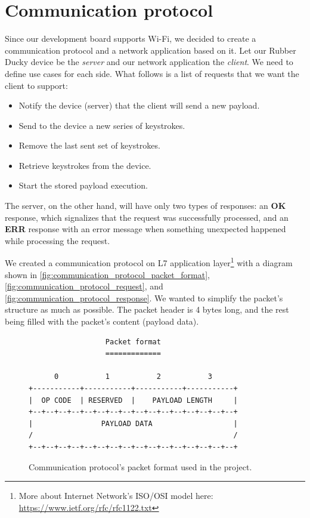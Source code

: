 \section{Communication protocol}
\label{sec:design_communication_protocol}
Since our development board supports Wi-Fi, we decided to create a communication protocol and a network application based on it. Let our Rubber Ducky device be the \emph{server} and our network application the \emph{client}. We need to define use cases for each side. What follows is a list of requests that we want the client to support:
\begin{itemize}
    \item Notify the device (server) that the client will send a new payload.
    \item Send to the device a new series of keystrokes.
    \item Remove the last sent set of keystrokes.
    \item Retrieve keystrokes from the device.
    \item Start the stored payload execution.
\end{itemize}

The server, on the other hand, will have only two types of responses: an \textbf{OK} response, which signalizes that the request was successfully processed, and an \textbf{ERR} response with an error message when something unexpected happened while processing the request.

We created a communication protocol on L7 application layer\footnote{More about Internet Network's ISO/OSI model here: \url{https://www.ietf.org/rfc/rfc1122.txt}} with a diagram shown in \autoref{fig:communication_protocol_packet_format}, \autoref{fig:communication_protocol_request}, and \autoref{fig:communication_protocol_response}. We wanted to simplify the packet's structure as much as possible. The packet header is 4 bytes long, and the rest being filled with the packet's content (payload data).

\begin{figure}[ht]
\centering
\begin{varwidth}{\linewidth}
\begin{verbatim}
                  Packet format
                  =============

      0           1           2           3
+-----------+-----------+-----------+-----------+
|  OP CODE  | RESERVED  |    PAYLOAD LENGTH     |
+--+--+--+--+--+--+--+--+--+--+--+--+--+--+--+--+
|                PAYLOAD DATA                   |
/                                               /
+--+--+--+--+--+--+--+--+--+--+--+--+--+--+--+--+
\end{verbatim}
\end{varwidth}
\caption{Communication protocol's packet format used in the project.}
\label{fig:communication_protocol_packet_format}
\end{figure}

